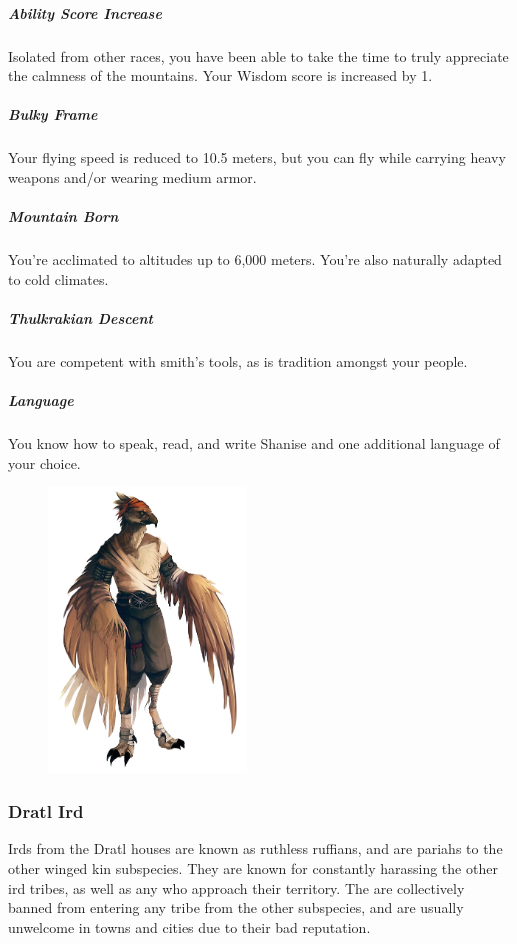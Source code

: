     \subparagraph{Ability Score Increase} Isolated from other races, you have been able to take the time to truly appreciate the calmness of the mountains.
    Your Wisdom score is increased by 1.

    \subparagraph{Bulky Frame} Your flying speed is reduced to 10.5 meters, but you can fly while carrying heavy weapons and/or wearing medium armor.

    \subparagraph{Mountain Born} You're acclimated to altitudes up to 6,000 meters.
    You're also naturally adapted to cold climates.

    \subparagraph{Thulkrakian Descent} You are competent with smith's tools, as is tradition amongst your people.

    \subparagraph{Language} You know how to speak, read, and write Shanise and one additional language of your choice.

\begin{figure}[!t]
    \centering
    \includegraphics[width=0.47\textwidth]{04kins/img/12ird_thulkraka.png}
\end{figure}

\subsubsection{Dratl Ird}
    Irds from the Dratl houses are known as ruthless ruffians, and are pariahs to the other winged kin subspecies.
    They are known for constantly harassing the other ird tribes, as well as any who approach their territory.
    The are collectively banned from entering any tribe from the other subspecies, and are usually unwelcome in towns and cities due to their bad reputation.

